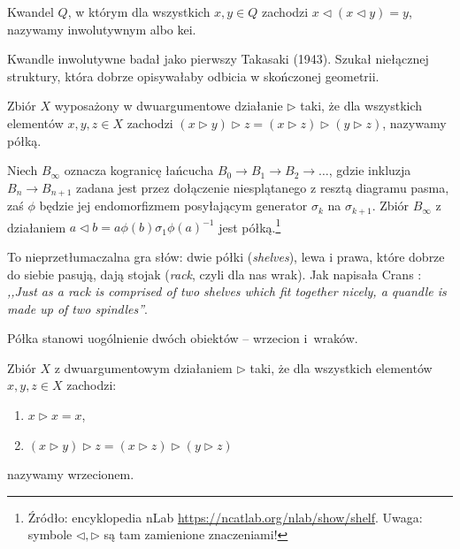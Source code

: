 \begin{definition}
%
%
    Kwandel $Q$, w którym dla wszystkich $x, y \in Q$ zachodzi $x \triangleleft (x \triangleleft y) = y$, nazywamy inwolutywnym albo kei.
\end{definition}

Kwandle inwolutywne badał jako pierwszy Takasaki (1943).
%
Szukał niełącznej struktury, która dobrze opisywałaby odbicia w skończonej geometrii.

\begin{definition}[półka]
%
    Zbiór $X$ wyposażony w dwuargumentowe działanie $\triangleright$ taki, że dla wszystkich elementów $x, y, z \in X$ zachodzi $(x \triangleright y) \triangleright z = (x \triangleright z) \triangleright (y \triangleright z)$, nazywamy półką.
\end{definition}

\begin{example}
%
    Niech $B_\infty$ oznacza kogranicę łańcucha $B_0 \to B_1 \to B_2 \to \ldots$, gdzie inkluzja $B_{n} \to B_{n+1}$ zadana jest przez dołączenie niesplątanego z resztą diagramu pasma, zaś $\phi$ będzie jej endomorfizmem posyłającym generator $\sigma_k$ na $\sigma_{k+1}$.
    Zbiór $B_\infty$ z działaniem $a \triangleleft b = a\phi(b)\sigma_1 \phi(a)^{-1}$ jest półką.\footnote{Źródło: encyklopedia nLab \url{https://ncatlab.org/nlab/show/shelf}. Uwaga: symbole $\triangleleft, \triangleright$ są tam zamienione znaczeniami!}
\end{example}

To nieprzetłumaczalna gra słów: dwie półki (\emph{shelves}), lewa i prawa, które dobrze do siebie pasują, dają stojak (\emph{rack}, czyli dla nas wrak).
Jak napisała Crans \cite[s. 86]{crans2004}: \emph{,,Just as a rack is comprised of two shelves which fit together nicely, a quandle is made up of two spindles''}.
%

Półka stanowi uogólnienie dwóch obiektów -- wrzecion i~wraków.

\begin{definition}[wrzeciono]
%
    Zbiór $X$ z dwuargumentowym działaniem $\triangleright$ taki, że dla wszystkich elementów $x, y, z \in X$ zachodzi:
    \begin{enumerate}
        \item $x \triangleright x = x$,
        \item $(x \triangleright y) \triangleright z = (x \triangleright z) \triangleright (y \triangleright z)$
    \end{enumerate}
    nazywamy wrzecionem.
\end{definition}

